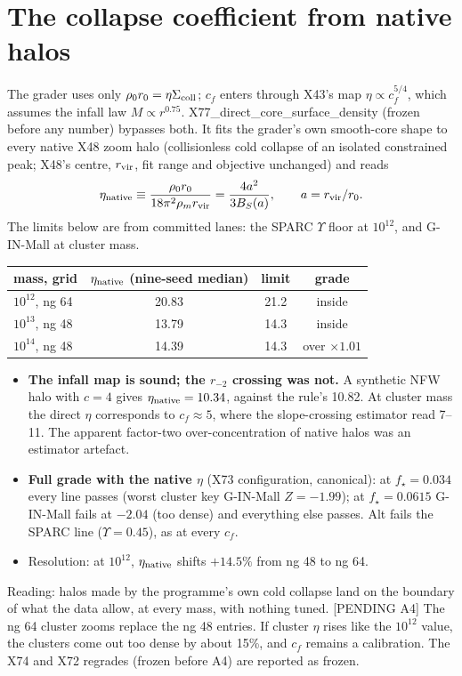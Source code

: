 \documentclass[10pt]{article}
\begin{document}
\section{The collapse coefficient from native halos}
The grader uses only $\rho_0r_0=\eta\Sigma_{\rm coll}$; $c_f$ enters through X43's map $\eta\propto c_f^{5/4}$, which assumes the infall law $M\propto r^{0.75}$. X77\_direct\_core\_surface\_density (frozen before any number) bypasses both. It fits the grader's own smooth-core shape to every native X48 zoom halo (collisionless cold collapse of an isolated constrained peak; X48's centre, $r_{\rm vir}$, fit range and objective unchanged) and reads
\[
\eta_{\rm native}\equiv\frac{\rho_0r_0}{18\pi^2\rho_m r_{\rm vir}}=\frac{4a^2}{3B_S(a)},\qquad a=r_{\rm vir}/r_0 .
\]
The limits below are from committed lanes: the SPARC $\Upsilon$ floor at $10^{12}$, and G-IN-Mall at cluster mass.

\begin{tabular}{@{}lccc@{}}\toprule
mass, grid & $\eta_{\rm native}$ (nine-seed median) & limit & grade\\\midrule
$10^{12}$, ng 64 & 20.83 & 21.2 & inside\\
$10^{13}$, ng 48 & 13.79 & 14.3 & inside\\
$10^{14}$, ng 48 & 14.39 & 14.3 & over $\times1.01$\\\bottomrule
\end{tabular}

\begin{itemize}
\item \textbf{The infall map is sound; the $r_{-2}$ crossing was not.} A synthetic NFW halo with $c=4$ gives $\eta_{\rm native}=10.34$, against the rule's 10.82. At cluster mass the direct $\eta$ corresponds to $c_f\approx5$, where the slope-crossing estimator read 7--11. The apparent factor-two over-concentration of native halos was an estimator artefact.
\item \textbf{Full grade with the native $\eta$} (X73 configuration, canonical): at $f_\star=0.034$ every line passes (worst cluster key G-IN-Mall $Z=-1.99$); at $f_\star=0.0615$ G-IN-Mall fails at $-2.04$ (too dense) and everything else passes. Alt fails the SPARC line ($\Upsilon=0.45$), as at every $c_f$.
\item Resolution: at $10^{12}$, $\eta_{\rm native}$ shifts $+14.5\%$ from ng 48 to ng 64.
\end{itemize}
Reading: halos made by the programme's own cold collapse land on the boundary of what the data allow, at every mass, with nothing tuned. [PENDING A4] The ng 64 cluster zooms replace the ng 48 entries. If cluster $\eta$ rises like the $10^{12}$ value, the clusters come out too dense by about 15\%, and $c_f$ remains a calibration. The X74 and X72 regrades (frozen before A4) are reported as frozen.
\end{document}
